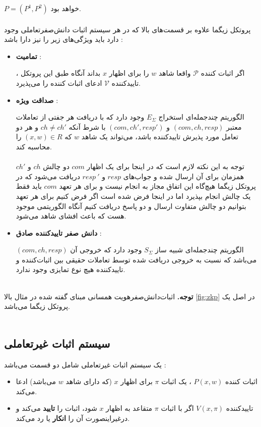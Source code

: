 $P = (P^1,P^2)$
خواهد بود.
\\
\\
پروتکل زیگما علاوه بر قسمت‌های بالا که در هر سیستم اثبات دانش‌صفر‌تعاملی وجود دارد باید ویژگی‌های زیر را نیز دارا باشد :

\begin{itemize}
\item[]{\bf تمامیت }:
	
اگر اثبات کننده
$\mathcal{P}$
واقعا شاهد 
$w$
را برای اظهار
$x$
بداند آنگاه طبق این پروتکل ، تاییدکننده 
$\mathcal{V}$
ادعای اثبات کننده را می‌پذیرد.
	
\item[]{\bf صداقت ویژه }:
	
 الگوریتم چندجمله‌ای استخراج
$E_{\Sigma}$
وجود دارد که با دریافت هر جفتی از تعاملات معتبر
$(com , ch , resp)$
و
$(com , ch' , resp')$
با شرط آنکه
$ch \ne ch'$
و هر دو تعامل مورد پذیرش تاییدکننده ‌باشد، 
می‌تواند یک شاهد 
$w$
 که  
$(x,w) \in R $
را محاسبه کند. 
\\
\\
توجه به این نکته لازم است که در اینجا برای یک اظهار
$com$
دو چالش 
$ch$
و
$ch'$
همزمان برای آن ارسال شده و جواب‌های
$resp$
و
${resp~}'$
دریافت می‌شود که در پروتکل زیگما هیچ‌گاه این اتفاق مجاز به انجام نیست و برای هر تعهد
$com$
باید  فقط یک چالش انجام بپذیرد اما در اینجا فرض شده است اگر فرض کنیم برای هر تعهد بتوانیم دو چالش متفاوت ارسال و دو پاسخ دریافت کنیم آنگاه الگوریتمی موجود هست که باعث افشای شاهد می‌شود.
	
\item[]{\bf دانش صفر تاییدکننده صادق } :
	
 الگوریتم چندجمله‌ای شبیه ساز 
$S_{\Sigma}$
وجود دارد که خروجی آن
$(com,ch,resp)$
می‌باشد که نسبت به خروجی دریافت شده توسط تعاملات حقیقی بین اثبات‌کننده و تاییدکننده هیچ  نوع تمایزی وجود ندارد.
\end{itemize}
~
\\
\textbf{توجه.}
اثبات‌دانش‌صفر‌هویت  همسانی ‌مبنای گفته شده در مثال بالا
\ref{fig:zkp}
 در اصل یک پروتکل زیگما می‌باشد.
\\
\\
\subsection{سیستم اثبات غیرتعاملی }\label{non-pf}
یک سیستم اثبات غیرتعاملی شامل دو قسمت می‌باشد :
\begin{itemize}
	
\item
 اثبات کننده 
$P(x,w)$
، یک اثبات
$\pi$
برای اظهار 
$x$
(که دارای شاهد
$w$
می‌باشد) ادعا می‌کند. 

\item
تاییدکننده 
$V(x,\pi)$
اگر با اثبات
$\pi$
متقاعد به اظهار
$x$
شود، اثبات را
\textbf{تایید}
 می‌کند و درغیراینصورت آن را
\textbf{انکار}
یا رد می‌کند.
	
\end{itemize}~

